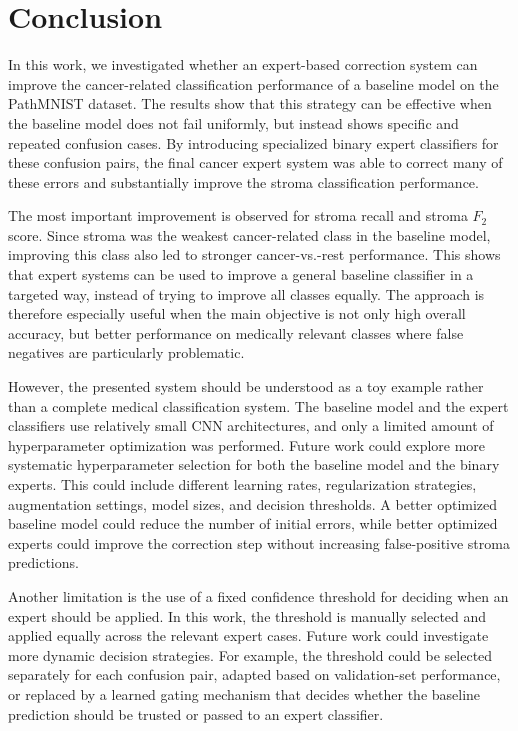 \section{Conclusion}
In this work, we investigated whether an expert-based correction system can
improve the cancer-related classification performance of a baseline model on the
PathMNIST dataset. The results show that this strategy can be effective when the
baseline model does not fail uniformly, but instead shows specific and repeated
confusion cases. By introducing specialized binary expert classifiers for these
confusion pairs, the final cancer expert system was able to correct many of
these errors and substantially improve the stroma classification performance.

The most important improvement is observed for stroma recall and stroma $F_2$
score. Since stroma was the weakest cancer-related class in the baseline model,
improving this class also led to stronger cancer-vs.-rest performance. This
shows that expert systems can be used to improve a general baseline classifier
in a targeted way, instead of trying to improve all classes equally. The
approach is therefore especially useful when the main objective is not only high
overall accuracy, but better performance on medically relevant classes where
false negatives are particularly problematic.

However, the presented system should be understood as a toy example rather than
a complete medical classification system. The baseline model and the expert
classifiers use relatively small CNN architectures, and only a limited amount of
hyperparameter optimization was performed. Future work could explore more
systematic hyperparameter selection for both the baseline model and the binary
experts. This could include different learning rates, regularization strategies,
augmentation settings, model sizes, and decision thresholds. A better optimized
baseline model could reduce the number of initial errors, while better optimized
experts could improve the correction step without increasing false-positive
stroma predictions.

Another limitation is the use of a fixed confidence threshold for deciding when
an expert should be applied. In this work, the threshold is manually selected
and applied equally across the relevant expert cases. Future work could
investigate more dynamic decision strategies. For example, the threshold could
be selected separately for each confusion pair, adapted based on validation-set
performance, or replaced by a learned gating mechanism that decides whether the
baseline prediction should be trusted or passed to an expert classifier.

